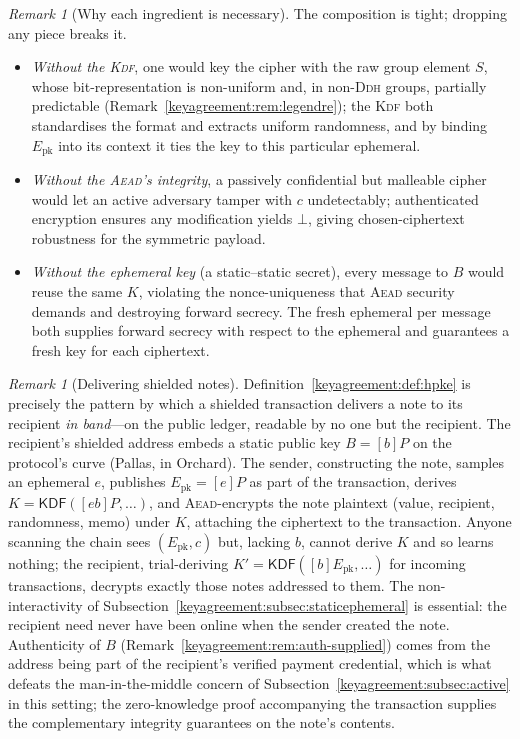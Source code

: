 \documentclass[11pt,a4paper]{article}
\theoremstyle{definition}
\theoremstyle{remark}
\newtheorem{remark}[theorem]{Remark}
\begin{document}
\begin{remark}[Why each ingredient is necessary]\label{keyagreement:rem:necessary}
The composition is tight; dropping any piece breaks it.
\begin{itemize}
  \item \emph{Without the \textsc{Kdf}}, one would key the cipher with the raw group element \(S\), whose bit-representation is non-uniform and, in non-\textsc{Ddh} groups, partially predictable (Remark~\ref{keyagreement:rem:legendre}); the \textsc{Kdf} both standardises the format and extracts uniform randomness, and by binding \(E_{\mathrm{pk}}\) into its context it ties the key to this particular ephemeral.
  \item \emph{Without the \textsc{Aead}'s integrity}, a passively confidential but malleable cipher would let an active adversary tamper with \(c\) undetectably; authenticated encryption ensures any modification yields \(\bot\), giving chosen-ciphertext robustness for the symmetric payload.
  \item \emph{Without the ephemeral key} (a static--static secret), every message to \(B\) would reuse the same \(K\), violating the nonce-uniqueness that \textsc{Aead} security demands and destroying forward secrecy. The fresh ephemeral per message both supplies forward secrecy with respect to the ephemeral and guarantees a fresh key for each ciphertext.
\end{itemize}
\end{remark}

\begin{remark}[Delivering shielded notes]\label{keyagreement:rem:notes}
Definition~\ref{keyagreement:def:hpke} is precisely the pattern by which a shielded transaction delivers a note to its recipient \emph{in band}---on the public ledger, readable by no one but the recipient. The recipient's shielded address embeds a static public key \(B = [b]P\) on the protocol's curve (Pallas, in Orchard). The sender, constructing the note, samples an ephemeral \(e\), publishes \(E_{\mathrm{pk}} = [e]P\) as part of the transaction, derives \(K = \mathsf{KDF}([eb]P, \dots)\), and \textsc{Aead}-encrypts the note plaintext (value, recipient, randomness, memo) under \(K\), attaching the ciphertext to the transaction. Anyone scanning the chain sees \((E_{\mathrm{pk}}, c)\) but, lacking \(b\), cannot derive \(K\) and so learns nothing; the recipient, trial-deriving \(K' = \mathsf{KDF}([b]E_{\mathrm{pk}}, \dots)\) for incoming transactions, decrypts exactly those notes addressed to them. The non-interactivity of Subsection~\ref{keyagreement:subsec:staticephemeral} is essential: the recipient need never have been online when the sender created the note. Authenticity of \(B\) (Remark~\ref{keyagreement:rem:auth-supplied}) comes from the address being part of the recipient's verified payment credential, which is what defeats the man-in-the-middle concern of Subsection~\ref{keyagreement:subsec:active} in this setting; the zero-knowledge proof accompanying the transaction supplies the complementary integrity guarantees on the note's contents.
\end{remark}
\clearpage
\end{document}
